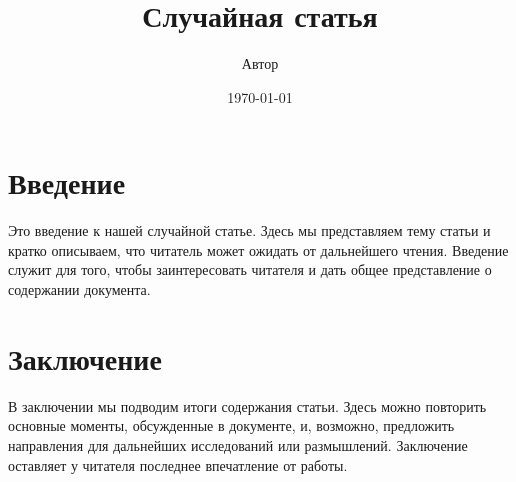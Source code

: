 \documentclass{article}
\title{Случайная статья}
\author{Автор}
\date{\today}
\begin{document}
\maketitle

\section{Введение}
Это введение к нашей случайной статье. Здесь мы представляем тему статьи и кратко описываем, что читатель может ожидать от дальнейшего чтения. Введение служит для того, чтобы заинтересовать читателя и дать общее представление о содержании документа.

\section{Заключение}
В заключении мы подводим итоги содержания статьи. Здесь можно повторить основные моменты, обсужденные в документе, и, возможно, предложить направления для дальнейших исследований или размышлений. Заключение оставляет у читателя последнее впечатление от работы.
\end{document}
